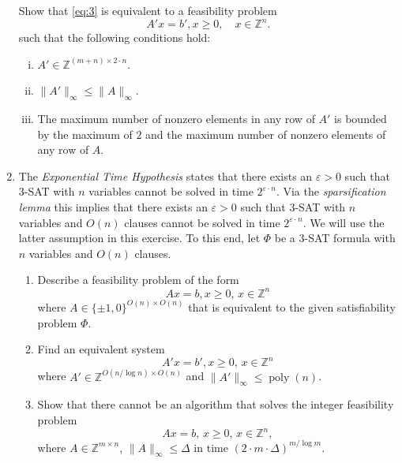 \documentclass[11pt,a4paper]{article}
\DeclareMathOperator{\poly}{poly}
\begin{document}
\begin{enumerate}
  Show that \eqref{eq:3} is equivalent to a feasibility problem
  \begin{displaymath}
    A'x = b', x≥0, \quad x ∈ ℤ^n.    
  \end{displaymath}
  such that the following conditions hold:
  \begin{enumerate}[i)] 
  \item $A' ∈ℤ^{ (m+n) ×2⋅n}$. 
  \item $\|A' \|_∞ ≤  \|A\|_∞$.
  \item The maximum number of nonzero elements in any row of $A'$ is
    bounded by the maximum of $2$ and the maximum number of nonzero
    elements of any row of $A$.
  \end{enumerate}

\item The \emph{Exponential Time Hypothesis} states that there exists an $ε>0$ such that   $3$-SAT  with $n$ variables cannot be solved in time $2^{ε ⋅n}$. Via the \emph{sparsification lemma} this implies that there exists an $ε>0$ such that   $3$-SAT  with $n$ variables and $O(n)$ clauses cannot be solved in time $2^{ε ⋅n}$.  We will use the latter assumption in this exercise. To this end, let $Φ$ be a $3$-SAT formula with $n$ variables and $O(n)$ clauses. 
  \begin{enumerate}
  \item Describe a feasibility problem of the form
    \begin{displaymath}
      Ax = b, x≥0, \, x ∈ ℤ^n 
    \end{displaymath}
    where $A ∈ \{ \pm 1,0 \}^{O(n) × O(n)}$ that is equivalent to the given satisfiability problem $Φ$. 
  \item  Find an equivalent system
    \begin{displaymath}
      A'x = b', x≥0, \, x ∈ ℤ^n 
    \end{displaymath}
    where $A' ∈ ℤ^{O(n / \log n) × O(n)}$ and $\|A'\|_∞ ≤\poly (n)$.
  \item Show that there cannot be an algorithm that solves the integer feasibility problem
    \begin{displaymath}
      Ax = b, \, x≥ 0, \, x ∈ℤ^n, 
    \end{displaymath}
    where $A ∈ ℤ^{m ×n}$, $\|A\|_∞ ≤Δ$ in time $ (2 ⋅m ⋅Δ)^{m / \log m}$. 
    
  \end{enumerate}
  


\end{enumerate}
\end{document}
